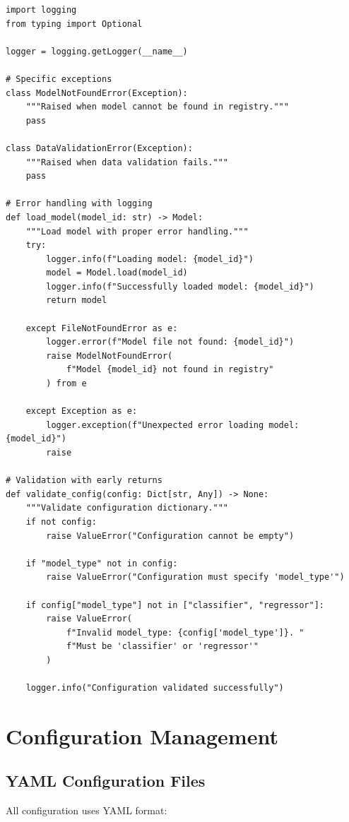 \begin{lstlisting}[style=python, caption=Error Handling Patterns]
import logging
from typing import Optional

logger = logging.getLogger(__name__)

# Specific exceptions
class ModelNotFoundError(Exception):
    """Raised when model cannot be found in registry."""
    pass

class DataValidationError(Exception):
    """Raised when data validation fails."""
    pass

# Error handling with logging
def load_model(model_id: str) -> Model:
    """Load model with proper error handling."""
    try:
        logger.info(f"Loading model: {model_id}")
        model = Model.load(model_id)
        logger.info(f"Successfully loaded model: {model_id}")
        return model

    except FileNotFoundError as e:
        logger.error(f"Model file not found: {model_id}")
        raise ModelNotFoundError(
            f"Model {model_id} not found in registry"
        ) from e

    except Exception as e:
        logger.exception(f"Unexpected error loading model: {model_id}")
        raise

# Validation with early returns
def validate_config(config: Dict[str, Any]) -> None:
    """Validate configuration dictionary."""
    if not config:
        raise ValueError("Configuration cannot be empty")

    if "model_type" not in config:
        raise ValueError("Configuration must specify 'model_type'")

    if config["model_type"] not in ["classifier", "regressor"]:
        raise ValueError(
            f"Invalid model_type: {config['model_type']}. "
            f"Must be 'classifier' or 'regressor'"
        )

    logger.info("Configuration validated successfully")
\end{lstlisting}

\section{Configuration Management}

\subsection{YAML Configuration Files}

All configuration uses YAML format:

